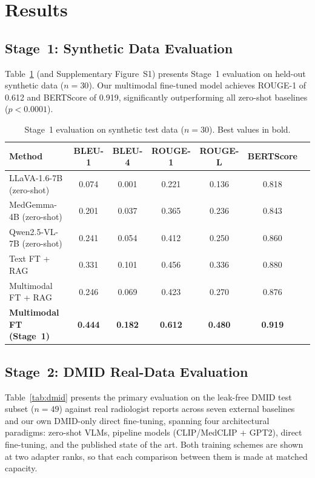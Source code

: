 \documentclass{wlscirep}
\begin{document}
\section*{Results}

\subsection*{Stage~1: Synthetic Data Evaluation}

Table~\ref{tab:synthetic} (and Supplementary Figure~S1) presents Stage~1 evaluation on held-out synthetic data ($n=30$). Our multimodal fine-tuned model achieves ROUGE-1 of 0.612 and BERTScore of 0.919, significantly outperforming all zero-shot baselines ($p < 0.0001$).

\begin{table}[H]
\centering
\caption{Stage~1 evaluation on synthetic test data ($n=30$). Best values in bold.}
\label{tab:synthetic}
\begin{tabular}{lcccccc}
\toprule
\textbf{Method} & \textbf{BLEU-1} & \textbf{BLEU-4} & \textbf{ROUGE-1} & \textbf{ROUGE-L} & \textbf{BERTScore} \\
\midrule
LLaVA-1.6-7B (zero-shot) & 0.074 & 0.001 & 0.221 & 0.136 & 0.818 \\
MedGemma-4B (zero-shot) & 0.201 & 0.037 & 0.365 & 0.236 & 0.843 \\
Qwen2.5-VL-7B (zero-shot) & 0.241 & 0.054 & 0.412 & 0.250 & 0.860 \\
Text FT + RAG & 0.331 & 0.101 & 0.456 & 0.336 & 0.880 \\
Multimodal FT + RAG & 0.246 & 0.069 & 0.423 & 0.270 & 0.876 \\
\textbf{Multimodal FT (Stage~1)} & \textbf{0.444} & \textbf{0.182} & \textbf{0.612} & \textbf{0.480} & \textbf{0.919} \\
\bottomrule
\end{tabular}
\end{table}
\subsection*{Stage~2: DMID Real-Data Evaluation}

Table~\ref{tab:dmid} presents the primary evaluation on the leak-free DMID test subset ($n=49$) against real radiologist reports across seven external baselines and our own DMID-only direct fine-tuning, spanning four architectural paradigms: zero-shot VLMs, pipeline models (CLIP/MedCLIP + GPT2), direct fine-tuning, and the published state of the art. Both training schemes are shown at two adapter ranks, so that each comparison between them is made at matched capacity.
\end{document}
